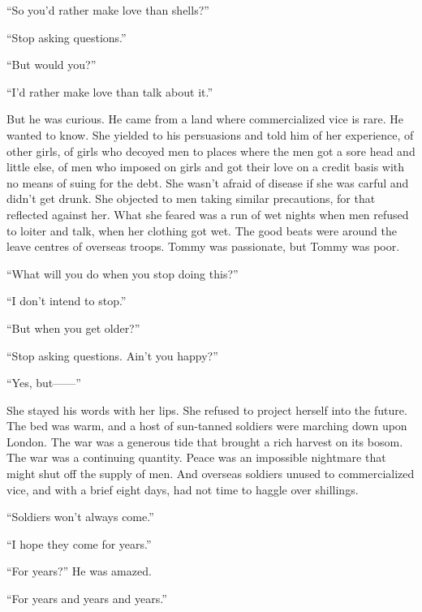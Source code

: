 ``So you'd rather make love than shells?''

``Stop asking questions.''

``But would you?''

``I'd rather make love than talk about it.''

But he was curious. He came from a land where commercialized vice is rare. He wanted to know. She yielded to his persuasions and told him of her experience, of other girls, of girls who decoyed men to places where the men got a sore head and little else, of men who imposed on girls and got their love on a credit basis with no means of suing for the debt. She wasn't afraid of disease if she was carful and didn't get drunk. She objected to men taking similar precautions, for that reflected against her. What she feared was a run of wet nights when men refused to loiter and talk, when her clothing got wet. The good beats were around the leave centres of overseas troops. Tommy was passionate, but Tommy was poor.

``What will you do when you stop doing this?''

``I don't intend to stop.''

``But when you get older?''

``Stop asking questions. Ain't you happy?''

``Yes, but------''

She stayed his words with her lips. She refused to project herself into the future. The bed was warm, and a host of sun-tanned soldiers were marching down upon London. The war was a generous tide that brought a rich harvest on its bosom. The war was a continuing quantity. Peace was an impossible nightmare that might shut off the supply of men. And overseas soldiers unused to commercialized vice, and with a brief eight days, had not time to haggle over shillings.

``Soldiers won't always come.''

``I hope they come for years.''

``For years?'' He was amazed.

``For years and years and years.''

